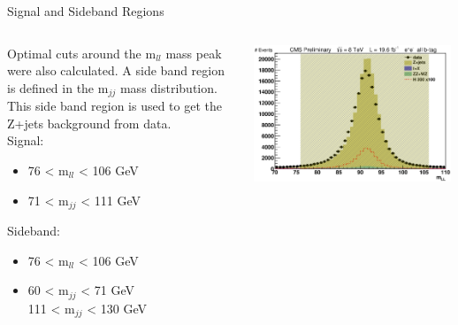 \begin{frame}{Signal and Sideband Regions}
  \begin{columns}
    \begin{column}{0.6\textwidth}
\footnotesize
\scriptsize
Optimal cuts around the m$_{ll}$ mass peak were also calculated. A side band region is defined in the m$_{jj}$ mass distribution.  This side band region is used to get the Z+jets background from data.
\\
\footnotesize
\vspace{1em}
      Signal:
      \begin{itemize}
      \item
        76 < m$_{ll}$ < 106 GeV
      \item
        71 < m$_{jj}$ < 111 GeV
      \end{itemize}
      Sideband:
      \begin{itemize}
      \item
        76 < m$_{ll}$ < 106 GeV
      \item
        60 < m$_{jj}$ < 71 GeV\\
        111 < m$_{jj}$ < 130 GeV
      \end{itemize}
\vspace{2em}
\scriptsize
    \end{column}
    \begin{column}{0.4\textwidth}
      \includegraphics[width=0.99\textwidth]{images/mLL_signal_sideband.eps}\\

\end{column}
\end{columns}
\end{frame}
